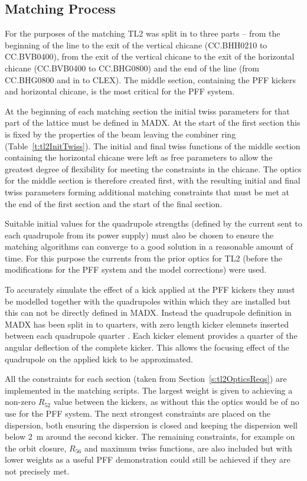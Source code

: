 \subsection{Matching Process}
\label{ss:matchingMethod}

For the purposes of the matching TL2 was split in to three parts -- from the beginning of the line to the exit of the vertical chicane (CC.BHH0210 to CC.BVB0400), from the exit of the vertical chicane to the exit of the horizontal chicane (CC.BVB0400 to CC.BHG0800) and the end of the line (from CC.BHG0800 and in to CLEX). The middle section, containing the PFF kickers and horizontal chicane, is the most critical for the PFF system.

At the beginning of each matching section the initial twiss parameters for that part of the lattice must be defined in MADX. At the start of the first section this is fixed by the properties of the beam leaving the combiner ring (Table~\ref{t:tl2InitTwiss}). The initial and final twiss functions of the middle section containing the horizontal chicane were left as free parameters to allow the greatest degree of flexibility for meeting the constraints in the chicane. The optics for the middle section is therefore created first, with the resulting initial and final twiss parameters forming additional matching constraints that must be met at the end of the first section and the start of the final section.

Suitable initial values for the quadrupole strengths (defined by the current sent to each quadrupole from its power supply) must also be chosen to ensure the matching algorithms can converge to a good solution in a reasonable amount of time. For this purpose the currents from the prior optics for TL2 (before the modifications for the PFF system and the model corrections) were used. 

To accurately simulate the effect of a kick applied at the PFF kickers they must be modelled together with the quadrupoles within which they are installed but this can not be directly defined in MADX. Instead the quadrupole definition in MADX has been split in to quarters, with zero length kicker elemnets inserted between each quadrupole quarter \cite{piotrPriv}. Each kicker element provides a quarter of the angular deflection of the complete kicker. This allows the focusing effect of the quadrupole on the applied kick to be approximated.

All the constraints for each section (taken from Section~\ref{s:tl2OpticsReqs}) are implemented in the matching scripts. The largest weight is given to achieving a non-zero \(R_{52}\) value between the kickers, as without this the optics would be of no use for the PFF system. The next strongest constraints are placed on the dispersion, both ensuring the dispersion is closed and keeping the dispersion well below 2~m around the second kicker. The remaining constraints, for example on the orbit closure, \(R_{56}\) and maximum twiss functions, are also included but with lower weights as a useful PFF demonstration could still be achieved if they are not precisely met.

